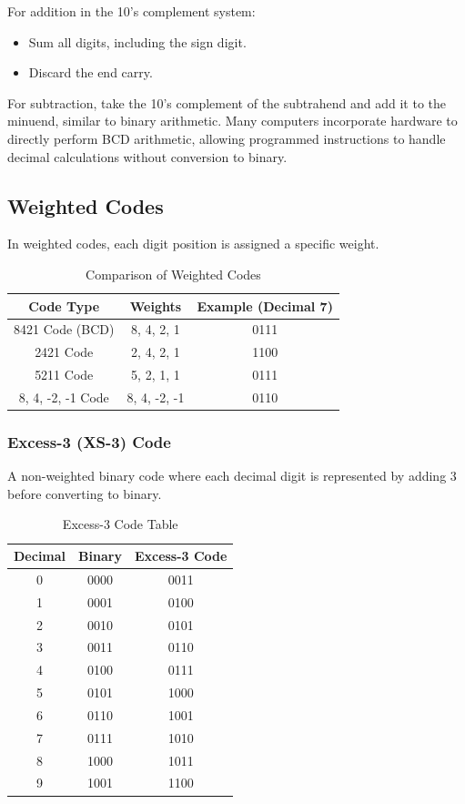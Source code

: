 \documentclass[a4paper,12pt]{article}
\begin{document}
For addition in the 10's complement system:
\begin{itemize}
    \item Sum all digits, including the sign digit.
    \item Discard the end carry.
\end{itemize}


For subtraction, take the 10’s complement of the subtrahend and add it to the minuend, similar to binary arithmetic. Many computers incorporate hardware to directly perform BCD arithmetic, allowing programmed instructions to handle decimal calculations without conversion to binary.

\subsection{Weighted Codes}
In weighted codes, each digit position is assigned a specific weight.

\begin{table}[h]
    \centering
    \begin{tabular}{|c|c|c|}
        \hline
        \textbf{Code Type} & \textbf{Weights} & \textbf{Example (Decimal 7)} \\
        \hline
        8421 Code (BCD) & 8, 4, 2, 1 & 0111 \\
        2421 Code & 2, 4, 2, 1 & 1100 \\
        5211 Code & 5, 2, 1, 1 & 0111 \\
        8, 4, -2, -1 Code & 8, 4, -2, -1 & 0110 \\
        \hline
    \end{tabular}
    \caption{Comparison of Weighted Codes}
\end{table}

\subsubsection{Excess-3 (XS-3) Code}
A non-weighted binary code where each decimal digit is represented by adding 3 before converting to binary.

\begin{table}[h]
    \centering
    \begin{tabular}{|c|c|c|}
        \hline
        \textbf{Decimal} & \textbf{Binary} & \textbf{Excess-3 Code} \\
        \hline
        0 & 0000 & 0011 \\
        1 & 0001 & 0100 \\
        2 & 0010 & 0101 \\
        3 & 0011 & 0110 \\
        4 & 0100 & 0111 \\
        5 & 0101 & 1000 \\
        6 & 0110 & 1001 \\
        7 & 0111 & 1010 \\
        8 & 1000 & 1011 \\
        9 & 1001 & 1100 \\
        \hline
    \end{tabular}
    \caption{Excess-3 Code Table}
\end{table}
\newpage
\end{document}

